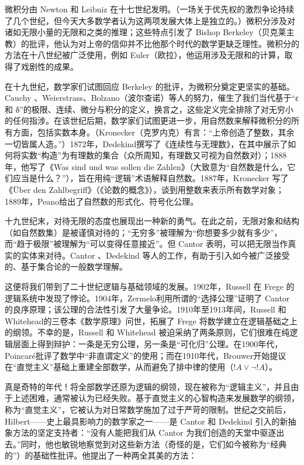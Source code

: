 \documentclass[../../../include/open-logic-section]{subfiles}
\begin{document}
微积分由 Newton 和 Leibniz 在十七世纪发明。（一场关于优先权的激烈争论持续了几个世纪，但今天大多数学者认为这两项发展大体上是独立的。）微积分涉及对诸如无限小量的无限和之类的推理；这些特点引发了 Bishop Berkeley（贝克莱主教）的批评，他认为对上帝的信仰并不比他那个时代的数学更缺乏理性。微积分的方法在十八世纪被广泛使用，例如 Euler（欧拉），他运用涉及无限和的计算，取得了戏剧性的成果。

在十九世纪，数学家们试图回应 Berkeley 的批评，为微积分奠定更坚实的基础。Cauchy 、Weierstrass、Bolzano（波尔查诺）等人的努力，催生了我们当代基于“ε 和 δ”的极限、连续、微分与积分的定义，换言之，这些定义完全排除了对无穷小的任何指涉。在该世纪后期，数学家们试图更进一步，用自然数来解释微积分的所有方面，包括实数本身。（Kronecker（克罗内克）有言：“上帝创造了整数，其余一切皆属人造。”）1872年，Dedekind撰写了《连续性与无理数》，在其中展示了如何将实数“构造”为有理数的集合（众所周知，有理数又可视为自然数对）；1888年，他写了《Was sind und was sollen die Zahlen》（大致意为“自然数是什么，它们应当是什么？”），旨在用纯“逻辑”术语解释自然数。1887年，Kronecker 写了《\"Uber den Zahlbegriff》（《论数的概念》），谈到用整数来表示所有数学对象；1889年，Peano给出了自然数的形式化、符号化公理。

十九世纪末，对待无限的态度也展现出一种新的勇气。在此之前，无限对象和结构（如自然数集）是被谨慎对待的；“无穷多”被理解为“你想要多少就有多少”，而“趋于极限”被理解为“可以变得任意接近”。但 Cantor 表明，可以把无限当作真实的实体来对待。Cantor 、Dedekind 等人的工作，有助于引入如今被广泛接受的、基于集合论的一般数学理解。

这便将我们带到了二十世纪逻辑与基础领域的发展。1902年，Russell 在 Frege 的逻辑系统中发现了悖论。1904年，Zermelo利用所谓的“选择公理”证明了 Cantor 的良序原理；该公理的合法性引发了大量争论。1910年至1913年间，Russell 和 Whitehead的三卷本《数学原理》问世，拓展了 Frege 将数学建立在逻辑基础之上的纲领。不幸的是，Russell 和 Whitehead 被迫采纳了两条原则，它们很难在纯逻辑层面上得到辩护：一条是无穷公理，另一条是“可化归”公理。在1900年代，Poincaré批评了数学中“非直谓定义”的使用；而在1910年代，Brouwer开始提议在“直觉主义”基础上重建全部数学，从而避免了排中律的使用（$!A \lor \lnot !A$）。

真是奇特的年代！将全部数学还原为逻辑的纲领，现在被称为“逻辑主义”，并且由于上述困难，通常被认为已经失败。基于直觉主义的心智构造来发展数学的纲领，称为“直觉主义”，它被认为对日常数学施加了过于严苛的限制。世纪之交前后，Hilbert——史上最具影响力的数学家之一——是 Cantor 和 Dedekind 引入的新抽象方法的坚定支持者：“没有人能把我们从 Cantor 为我们创造的天堂中驱逐出去。”同时，他也敏锐地察觉到对这些新方法（奇怪的是，它们如今被称为“经典的”）的基础性批评。他提出了一种两全其美的方法：
\end{document}

